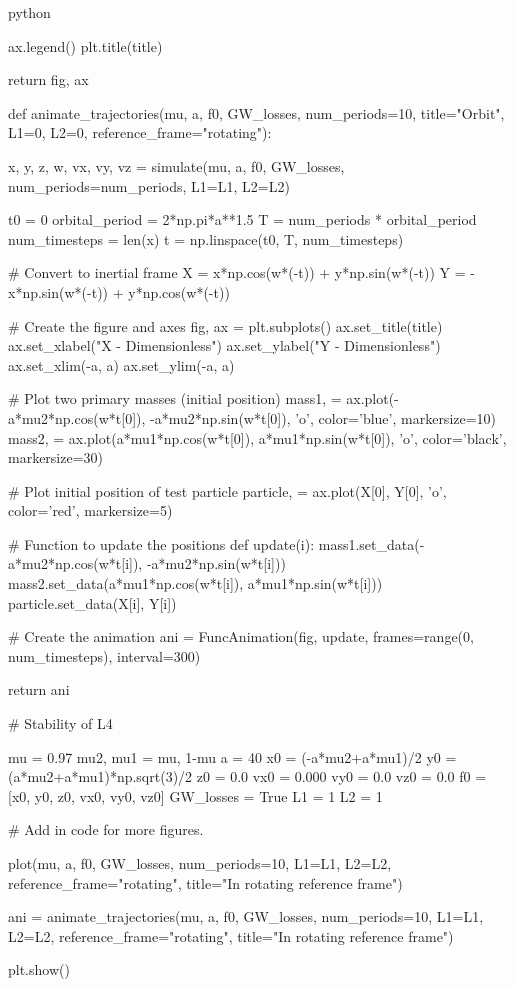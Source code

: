 \documentclass{article}
\begin{document}
\begin{mintedbox}{python}
    
    ax.legend()
    plt.title(title)
    
    return fig, ax

def animate_trajectories(mu, a, f0, GW_losses, num_periods=10, title="Orbit", L1=0, L2=0, reference_frame="rotating"):
    
    x, y, z, w, vx, vy, vz = simulate(mu, a, f0, GW_losses, num_periods=num_periods, L1=L1, L2=L2)
    
    t0 = 0
    orbital_period = 2*np.pi*a**1.5
    T = num_periods * orbital_period
    num_timesteps = len(x)
    t = np.linspace(t0, T, num_timesteps)
    
    # Convert to inertial frame
    X = x*np.cos(w*(-t)) + y*np.sin(w*(-t))
    Y = -x*np.sin(w*(-t)) + y*np.cos(w*(-t))

    # Create the figure and axes
    fig, ax = plt.subplots()
    ax.set_title(title)
    ax.set_xlabel("X - Dimensionless")
    ax.set_ylabel("Y - Dimensionless")
    ax.set_xlim(-a, a)
    ax.set_ylim(-a, a)

    # Plot two primary masses (initial position)
    mass1, = ax.plot(-a*mu2*np.cos(w*t[0]), -a*mu2*np.sin(w*t[0]), 'o', color='blue', markersize=10)
    mass2, = ax.plot(a*mu1*np.cos(w*t[0]), a*mu1*np.sin(w*t[0]), 'o', color='black', markersize=30)

    # Plot initial position of test particle
    particle, = ax.plot(X[0], Y[0], 'o', color='red', markersize=5)

    # Function to update the positions
    def update(i):
        mass1.set_data(-a*mu2*np.cos(w*t[i]), -a*mu2*np.sin(w*t[i]))
        mass2.set_data(a*mu1*np.cos(w*t[i]), a*mu1*np.sin(w*t[i]))
        particle.set_data(X[i], Y[i])

    # Create the animation
    ani = FuncAnimation(fig, update, frames=range(0, num_timesteps), interval=300)

    return ani


# Stability of L4

mu = 0.97
mu2, mu1 = mu, 1-mu
a = 40
x0 = (-a*mu2+a*mu1)/2
y0 = (a*mu2+a*mu1)*np.sqrt(3)/2
z0 = 0.0
vx0 = 0.000
vy0 = 0.0
vz0 = 0.0
f0 = [x0, y0, z0, vx0, vy0, vz0]
GW_losses = True
L1 = 1
L2 = 1

# Add in code for more figures.

plot(mu, a, f0, GW_losses, num_periods=10, L1=L1, L2=L2, reference_frame="rotating", title="In rotating reference frame")

ani = animate_trajectories(mu, a, f0, GW_losses, num_periods=10, L1=L1, L2=L2, reference_frame="rotating", title="In rotating reference frame")

plt.show()
\end{mintedbox}
\end{document}
